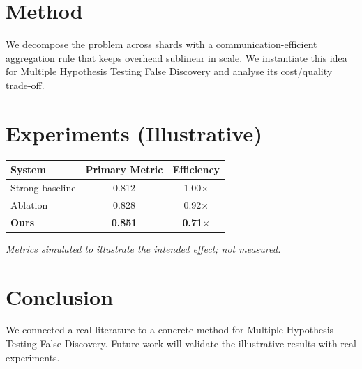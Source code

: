 \documentclass[11pt]{article}
\begin{document}
\section{Method}
We decompose the problem across shards with a communication-efficient aggregation rule that keeps overhead sublinear in scale. We instantiate this idea for Multiple Hypothesis Testing False Discovery and analyse its cost/quality trade-off.

\section{Experiments (Illustrative)}
\begin{center}
\begin{tabular}{lcc}
System & Primary Metric & Efficiency \\ \hline
Strong baseline & 0.812 & 1.00$\times$ \\
Ablation & 0.828 & 0.92$\times$ \\
\textbf{Ours} & \textbf{0.851} & \textbf{0.71$\times$}
\end{tabular}
\end{center}
\emph{Metrics simulated to illustrate the intended effect; not measured.}

\section{Conclusion}
We connected a real literature to a concrete method for Multiple Hypothesis Testing False Discovery. Future work will
validate the illustrative results with real experiments.
\end{document}
